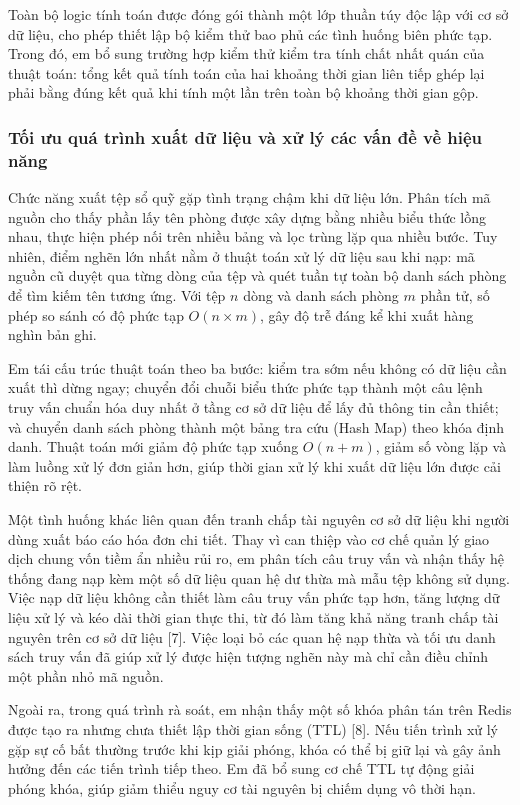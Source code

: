 Toàn bộ logic tính toán được đóng gói thành một lớp thuần túy độc lập với cơ sở dữ liệu, cho phép thiết lập bộ kiểm thử bao phủ các tình huống biên phức tạp. Trong đó, em bổ sung trường hợp kiểm thử kiểm tra tính chất nhất quán của thuật toán: tổng kết quả tính toán của hai khoảng thời gian liên tiếp ghép lại phải bằng đúng kết quả khi tính một lần trên toàn bộ khoảng thời gian gộp.

\subsubsection{Tối ưu quá trình xuất dữ liệu và xử lý các vấn đề về hiệu năng}

Chức năng xuất tệp sổ quỹ gặp tình trạng chậm khi dữ liệu lớn. Phân tích mã nguồn cho thấy phần lấy tên phòng được xây dựng bằng nhiều biểu thức lồng nhau, thực hiện phép nối trên nhiều bảng và lọc trùng lặp qua nhiều bước. Tuy nhiên, điểm nghẽn lớn nhất nằm ở thuật toán xử lý dữ liệu sau khi nạp: mã nguồn cũ duyệt qua từng dòng của tệp và quét tuần tự toàn bộ danh sách phòng để tìm kiếm tên tương ứng. Với tệp $n$ dòng và danh sách phòng $m$ phần tử, số phép so sánh có độ phức tạp $O(n \times m)$, gây độ trễ đáng kể khi xuất hàng nghìn bản ghi.

Em tái cấu trúc thuật toán theo ba bước: kiểm tra sớm nếu không có dữ liệu cần xuất thì dừng ngay; chuyển đổi chuỗi biểu thức phức tạp thành một câu lệnh truy vấn chuẩn hóa duy nhất ở tầng cơ sở dữ liệu để lấy đủ thông tin cần thiết; và chuyển danh sách phòng thành một bảng tra cứu (Hash Map) theo khóa định danh. Thuật toán mới giảm độ phức tạp xuống $O(n + m)$, giảm số vòng lặp và làm luồng xử lý đơn giản hơn, giúp thời gian xử lý khi xuất dữ liệu lớn được cải thiện rõ rệt.

Một tình huống khác liên quan đến tranh chấp tài nguyên cơ sở dữ liệu khi người dùng xuất báo cáo hóa đơn chi tiết. Thay vì can thiệp vào cơ chế quản lý giao dịch chung vốn tiềm ẩn nhiều rủi ro, em phân tích câu truy vấn và nhận thấy hệ thống đang nạp kèm một số dữ liệu quan hệ dư thừa mà mẫu tệp không sử dụng. Việc nạp dữ liệu không cần thiết làm câu truy vấn phức tạp hơn, tăng lượng dữ liệu xử lý và kéo dài thời gian thực thi, từ đó làm tăng khả năng tranh chấp tài nguyên trên cơ sở dữ liệu [7]. Việc loại bỏ các quan hệ nạp thừa và tối ưu danh sách truy vấn đã giúp xử lý được hiện tượng nghẽn này mà chỉ cần điều chỉnh một phần nhỏ mã nguồn.

Ngoài ra, trong quá trình rà soát, em nhận thấy một số khóa phân tán trên Redis được tạo ra nhưng chưa thiết lập thời gian sống (TTL) [8]. Nếu tiến trình xử lý gặp sự cố bất thường trước khi kịp giải phóng, khóa có thể bị giữ lại và gây ảnh hưởng đến các tiến trình tiếp theo. Em đã bổ sung cơ chế TTL tự động giải phóng khóa, giúp giảm thiểu nguy cơ tài nguyên bị chiếm dụng vô thời hạn.

